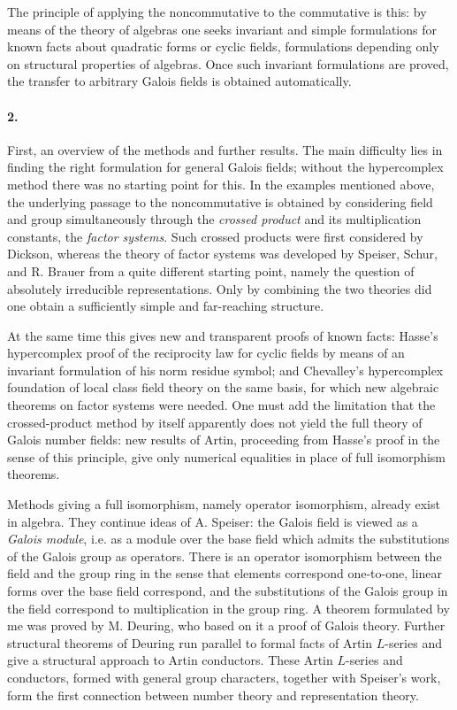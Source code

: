 \documentclass[11pt]{article}
\begin{document}
The principle of applying the noncommutative to the commutative is this: by means of the theory of algebras one seeks invariant and simple formulations for known facts about quadratic forms or cyclic fields, formulations depending only on structural properties of algebras. Once such invariant formulations are proved, the transfer to arbitrary Galois fields is obtained automatically.

\paragraph{2.}
First, an overview of the methods and further results. The main difficulty lies in finding the right formulation for general Galois fields; without the hypercomplex method there was no starting point for this. In the examples mentioned above, the underlying passage to the noncommutative is obtained by considering field and group simultaneously through the \emph{crossed product} and its multiplication constants, the \emph{factor systems}. Such crossed products were first considered by Dickson, whereas the theory of factor systems was developed by Speiser, Schur, and R. Brauer from a quite different starting point, namely the question of absolutely irreducible representations. Only by combining the two theories did one obtain a sufficiently simple and far-reaching structure.

At the same time this gives new and transparent proofs of known facts: Hasse's hypercomplex proof of the reciprocity law for cyclic fields by means of an invariant formulation of his norm residue symbol; and Chevalley's hypercomplex foundation of local class field theory on the same basis, for which new algebraic theorems on factor systems were needed. One must add the limitation that the crossed-product method by itself apparently does not yield the full theory of Galois number fields: new results of Artin, proceeding from Hasse's proof in the sense of this principle, give only numerical equalities in place of full isomorphism theorems.

Methods giving a full isomorphism, namely operator isomorphism, already exist in algebra. They continue ideas of A. Speiser: the Galois field is viewed as a \emph{Galois module}, i.e. as a module over the base field which admits the substitutions of the Galois group as operators. There is an operator isomorphism between the field and the group ring in the sense that elements correspond one-to-one, linear forms over the base field correspond, and the substitutions of the Galois group in the field correspond to multiplication in the group ring. A theorem formulated by me was proved by M. Deuring, who based on it a proof of Galois theory. Further structural theorems of Deuring run parallel to formal facts of Artin \(L\)-series and give a structural approach to Artin conductors. These Artin \(L\)-series and conductors, formed with general group characters, together with Speiser's work, form the first connection between number theory and representation theory.
\end{document}
